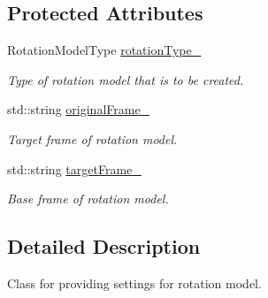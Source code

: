 \subsection*{Protected Attributes}
\begin{DoxyCompactItemize}
\item 
Rotation\+Model\+Type \hyperlink{classtudat_1_1simulation__setup_1_1RotationModelSettings_af2b7a9868f25f739090e438acee36304}{rotation\+Type\+\_\+}\hypertarget{classtudat_1_1simulation__setup_1_1RotationModelSettings_af2b7a9868f25f739090e438acee36304}{}\label{classtudat_1_1simulation__setup_1_1RotationModelSettings_af2b7a9868f25f739090e438acee36304}

\begin{DoxyCompactList}\small\item\em Type of rotation model that is to be created. \end{DoxyCompactList}\item 
std\+::string \hyperlink{classtudat_1_1simulation__setup_1_1RotationModelSettings_a3664732bd644fd17c1c56a9193816d60}{original\+Frame\+\_\+}\hypertarget{classtudat_1_1simulation__setup_1_1RotationModelSettings_a3664732bd644fd17c1c56a9193816d60}{}\label{classtudat_1_1simulation__setup_1_1RotationModelSettings_a3664732bd644fd17c1c56a9193816d60}

\begin{DoxyCompactList}\small\item\em Target frame of rotation model. \end{DoxyCompactList}\item 
std\+::string \hyperlink{classtudat_1_1simulation__setup_1_1RotationModelSettings_a5e950c3ec40646eac2ae85eea100ae6f}{target\+Frame\+\_\+}\hypertarget{classtudat_1_1simulation__setup_1_1RotationModelSettings_a5e950c3ec40646eac2ae85eea100ae6f}{}\label{classtudat_1_1simulation__setup_1_1RotationModelSettings_a5e950c3ec40646eac2ae85eea100ae6f}

\begin{DoxyCompactList}\small\item\em Base frame of rotation model. \end{DoxyCompactList}\end{DoxyCompactItemize}


\subsection{Detailed Description}
Class for providing settings for rotation model. 

